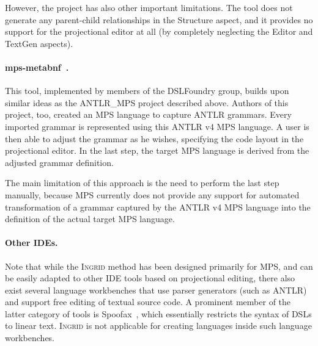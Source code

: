 However, the project has also other important limitations.
The tool does not generate any parent-child relationships in the Structure aspect, and it provides no support for the projectional editor at all (by completely neglecting the Editor and TextGen aspects).

\paragraph{mps-metabnf~\cite{ref:MPSMETABNF}.} This tool, implemented by members of the DSLFoundry group, builds upon similar ideas as the ANTLR{\_}MPS project described above.
Authors of this project, too, created an MPS language to capture ANTLR grammars.
Every imported grammar is represented using this ANTLR v4 MPS language.
A user is then able to adjust the grammar as he wishes, specifying the code layout in the projectional editor.
In the last step, the target MPS language is derived from the adjusted grammar definition.

The main limitation of this approach is the need to perform the last step manually, because MPS currently does not provide any support for automated transformation of a grammar captured by the ANTLR v4 MPS language into the definition of the actual target MPS language.

\paragraph{Other IDEs.}
Note that while the \textsc{Ingrid} method has been designed primarily for MPS, and can be easily adapted to other IDE tools based on projectional editing, there also exist several language workbenches that use parser generators (such as ANTLR) and support free editing of textual source code.
A prominent member of the latter category of tools is Spoofax~\cite{ref:KV10}, which essentially restricts the syntax of DSLs to linear text.
\textsc{Ingrid} is not applicable for creating languages inside such language workbenches.


